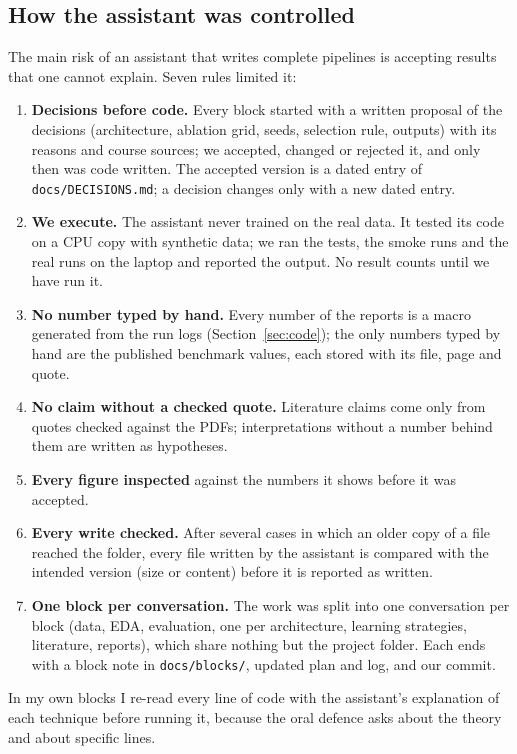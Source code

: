 \subsection{How the assistant was controlled}

The main risk of an assistant that writes complete pipelines is accepting results that one cannot
explain. Seven rules limited it:
\begin{enumerate}[leftmargin=1.4em,itemsep=1pt]
  \item \textbf{Decisions before code.} Every block started with a written proposal of the decisions
        (architecture, ablation grid, seeds, selection rule, outputs) with its reasons and course
        sources; we accepted, changed or rejected it, and only then was code written. The accepted
        version is a dated entry of \texttt{docs/DECISIONS.md}; a decision changes only with a new dated
        entry.
  \item \textbf{We execute.} The assistant never trained on the real data. It tested its code on a CPU
        copy with synthetic data; we ran the tests, the smoke runs and the real runs on the laptop and
        reported the output. No result counts until we have run it.
  \item \textbf{No number typed by hand.} Every number of the reports is a macro generated from the run
        logs (Section~\ref{sec:code}); the only numbers typed by hand are the published benchmark values,
        each stored with its file, page and quote.
  \item \textbf{No claim without a checked quote.} Literature claims come only from quotes checked
        against the PDFs; interpretations without a number behind them are written as hypotheses.
  \item \textbf{Every figure inspected} against the numbers it shows before it was accepted.
  \item \textbf{Every write checked.} After several cases in which an older copy of a file reached the
        folder, every file written by the assistant is compared with the intended version (size or
        content) before it is reported as written.
  \item \textbf{One block per conversation.} The work was split into one conversation per block
        (data, EDA, evaluation, one per architecture, learning strategies, literature, reports), which
        share nothing but the project folder. Each ends with a block note in \texttt{docs/blocks/},
        updated plan and log, and our commit.
\end{enumerate}
In my own blocks I re-read every line of code with the assistant's explanation of each technique before
running it, because the oral defence asks about the theory and about specific lines.

